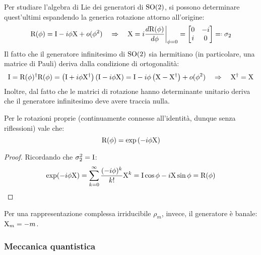 Per studiare l'algebra di Lie dei generatori di $ \mathrm{SO}(2) $, si possono determinare quest'ultimi espandendo la generica rotazione attorno all'origine:
\begin{equation}
	\tens{R}(\phi) = \tens{I} - i \phi \tens{X} + o(\phi^2)
	\quad \Rightarrow \quad
	\tens{X} = i \frac{d \tens{R}(\phi)}{d\phi} \bigg\vert_{\phi = 0} =
	\begin{bmatrix}
		0 & -i \\ i & 0
	\end{bmatrix}
	\eqdef \sigma_2
	\label{eq:9.5}
\end{equation}
Il fatto che il generatore infinitesimo di $ \mathrm{SO}(2) $ sia hermitiano (in particolare, una matrice di Pauli) deriva dalla condizione di ortogonalità:
\begin{equation*}
	\mathrm{I} = \mathrm{R}(\phi)^{\dagger} \mathrm{R}(\phi) = \left( \mathrm{I} + i \phi \mathrm{X}^{\dagger} \right) \left( \mathrm{I} - i \phi \mathrm{X} \right) = \mathrm{I} - i \phi \left( \mathrm{X} - \mathrm{X}^{\dagger} \right) + o(\phi^2)
	\quad \Rightarrow \quad
	\mathrm{X}^{\dagger} = \mathrm{X}
\end{equation*}
Inoltre, dal fatto che le matrici di rotazione hanno determinante unitario deriva che il generatore infinitesimo deve avere traccia nulla.

\begin{proposition}
	Per le rotazioni proprie (continuamente connesse all'identità, dunque senza riflessioni) vale che:
	\begin{equation}
		\mathrm{R}(\phi) = \exp \left( - i \phi \mathrm{X} \right)
		\label{eq:9.6}
	\end{equation}
\end{proposition}
\begin{proof}
	Ricordando che $ \sigma_2^2 = \mathrm{I} $:
	\begin{equation*}
		\exp (-i \phi \mathrm{X}) = \sum_{k = 0}^{\infty} \frac{(-i \phi)^k}{k!} \mathrm{X}^k = \mathrm{I} \cos \phi -i \mathrm{X} \sin \phi = \mathrm{R}(\phi)
	\end{equation*}
\end{proof}

Per una rappresentazione complessa irriducibile $ \rho_m $, invece, il generatore è banale: $ \mathrm{X}_m = -m $.

\subsubsection{Meccanica quantistica}

